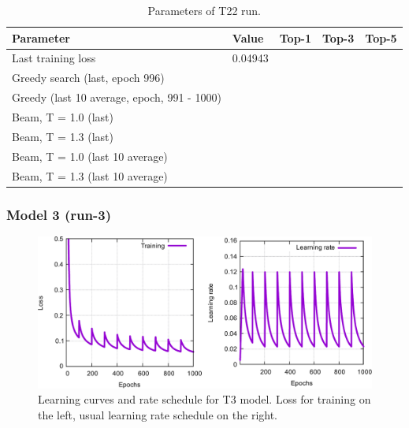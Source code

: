 \documentclass{article}
\begin{document}
\begin{table}[h!]
\caption{Parameters of T22 run.}
  \centering
  \begin{tabular}{p{8.2cm}p{1.5cm}p{1.5cm}p{1.5cm}p{1.5cm}}
    \toprule
    Parameter & Value & Top-1 & Top-3 & Top-5 \\
    \midrule
    Last training loss & 0.04943 & & & \\
    \midrule
    Greedy search (last, epoch 996) & &  & & \\
    Greedy (last 10 average, epoch, 991 - 1000) & &  & & \\
    \midrule
    Beam, T = 1.0 (last) & &  &  &  \\
    Beam, T = 1.3 (last) & &  &  &   \\ 
    \midrule
    Beam, T = 1.0 (last 10 average) & &  &  &  \\
    Beam, T = 1.3 (last 10 average) & &  &  &  \\ 
    \bottomrule
  \end{tabular}
  \label{tbl:t11}

\end{table} 

 
 \newpage
 \subsubsection{Model 3 (run-3)}
 
\begin{figure}[h!]
  \centering
  \includegraphics[width = 16.5cm]{images/t3-1.pdf}
  \caption{Learning curves and rate schedule for T3 model. Loss for training on the left, usual learning rate schedule on the right.}
  \label{fig:t11}
\end{figure}
\end{document}
